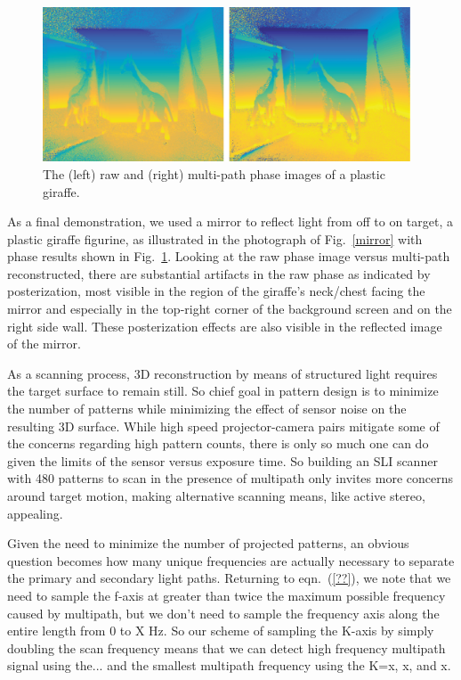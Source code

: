 \documentclass[10pt]{article}
\begin{document}
\begin{figure}[!t]
	\centering\includegraphics[width=4.30in]{Figures/result03}
	\caption{The (left) raw and (right) multi-path phase images of a plastic giraffe.}
	\label{mirrorresu}
\end{figure}

As a final demonstration, we used a mirror to reflect light from off to on target, a plastic giraffe figurine, as illustrated in the photograph of Fig.~\ref{mirror} with phase results shown in Fig.~\ref{mirrorresu}.  Looking at the raw phase image versus multi-path reconstructed, there are substantial artifacts in the raw phase as indicated by posterization, most visible in the region of the giraffe's neck/chest facing the mirror and especially in the top-right corner of the background screen and on the right side wall. These posterization effects are also visible in the reflected image of the mirror.

As a scanning process, 3D reconstruction by means of structured light requires the target surface to remain still. So chief goal in pattern design is to minimize the number of patterns while minimizing the effect of sensor noise on the resulting 3D surface.  While high speed projector-camera pairs mitigate some of the concerns regarding high pattern counts, there is only so much one can do given the limits of the sensor versus exposure time.  So building an SLI scanner with 480 patterns to scan in the presence of multipath only invites more concerns around target motion, making alternative scanning means,  like active stereo, appealing. 

Given the need to minimize the number of projected patterns, an obvious question becomes how many unique frequencies are actually necessary to separate the primary and secondary light paths.  Returning to eqn.~(\ref{??}), we note that we need to sample the f-axis at greater than twice the maximum possible frequency caused by multipath, but we don't need to sample the frequency axis along the entire length from 0 to X Hz. So our scheme of sampling the K-axis by simply doubling the scan frequency means that we can detect high frequency multipath signal using the... and the smallest multipath frequency using the K=x, x, and x. 
\end{document}

